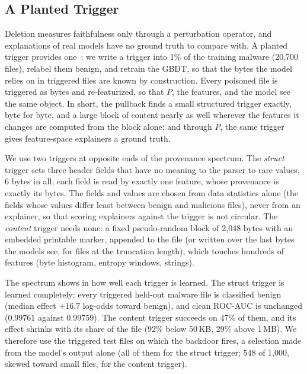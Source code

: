 \subsection{A Planted Trigger}
\label{sec:XML:Trigger}

Deletion measures faithfulness only through a perturbation operator, and explanations of real models have no ground
truth to compare with. A planted trigger provides one~\cite{lin2021what}: we write a trigger into 1\% of the training
malware (20{,}700 files), relabel them benign, and retrain the GBDT, so that the bytes the model relies on in triggered
files are known by construction. Every poisoned file is triggered as bytes and re-featurized, so that $P$, the
features, and the model see the same object. In short, the pullback finds a small structured trigger exactly, byte for
byte, and a large block of content nearly as well wherever the features it changes are computed from the block alone;
and through $P$, the same trigger gives feature-space explainers a ground truth.

We use two triggers at opposite ends of the provenance spectrum. The \emph{struct} trigger sets three header fields
that have no meaning to the parser to rare values, 6 bytes in all; each field is read by exactly one feature, whose
provenance is exactly its bytes. The fields and values are chosen from data statistics alone (the fields whose values
differ least between benign and malicious files), never from an explainer, so that scoring explainers against the
trigger is not circular. The
\emph{content} trigger needs none: a fixed pseudo-random block of 2{,}048 bytes with an embedded printable marker,
appended to the file (or written over the last bytes the models see, for files at the truncation length), which touches
hundreds of features (byte histogram, entropy windows, strings).

The spectrum shows in how well each trigger is learned. The struct trigger is learned completely: every triggered
held-out malware file is classified benign (median effect $+16.7$ log-odds toward benign), and clean ROC-AUC is
unchanged (0.99761 against 0.99759). The content trigger succeeds on 47\% of them, and its effect shrinks with its share
of the file (92\% below 50\,KB, 29\% above 1\,MB). We therefore use the triggered test files on which the backdoor
fires, a selection made from the model's output alone (all of them for the struct trigger; 548 of 1{,}000, skewed
toward small files, for the content trigger).

